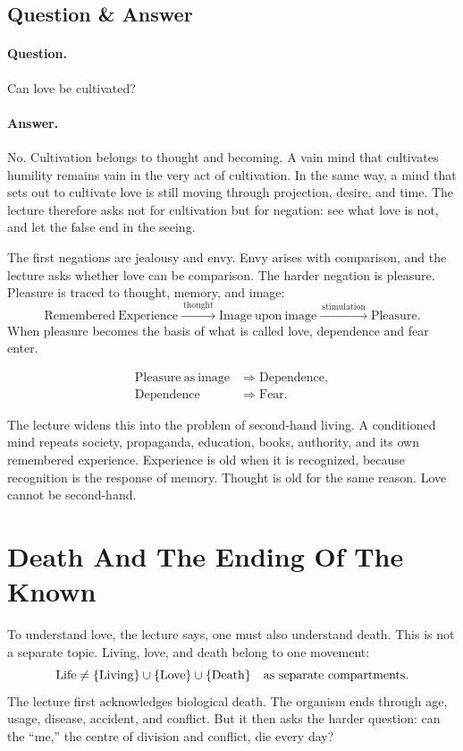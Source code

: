\documentclass[11pt,oneside]{book}
\begin{document}
\subsection{Question \& Answer}

\paragraph{Question.}
Can love be cultivated?

\paragraph{Answer.}
No. Cultivation belongs to thought and becoming. A vain mind that cultivates humility remains vain in the very act of cultivation. In the same way, a mind that sets out to cultivate love is still moving through projection, desire, and time. The lecture therefore asks not for cultivation but for negation: see what love is not, and let the false end in the seeing.

The first negations are jealousy and envy. Envy arises with comparison, and the lecture asks whether love can be comparison. The harder negation is pleasure. Pleasure is traced to thought, memory, and image:
\begin{equation}
\mathrm{Remembered\ Experience}
\xrightarrow{\ \mathrm{thought}\ }
\mathrm{Image\ upon\ image}
\xrightarrow{\ \mathrm{stimulation}\ }
\mathrm{Pleasure}.
\end{equation}
When pleasure becomes the basis of what is called love, dependence and fear enter.

\begin{align}
\mathrm{Pleasure\ as\ image} &\Rightarrow \mathrm{Dependence},\\
\mathrm{Dependence} &\Rightarrow \mathrm{Fear}.
\end{align}

The lecture widens this into the problem of second-hand living. A conditioned mind repeats society, propaganda, education, books, authority, and its own remembered experience. Experience is old when it is recognized, because recognition is the response of memory. Thought is old for the same reason. Love cannot be second-hand.

\section{Death And The Ending Of The Known}

To understand love, the lecture says, one must also understand death. This is not a separate topic. Living, love, and death belong to one movement:
\begin{equation}
\mathrm{Life}
\neq
\{\mathrm{Living}\}\cup\{\mathrm{Love}\}\cup\{\mathrm{Death}\}
\quad
\hbox{as separate compartments.}
\end{equation}
The lecture first acknowledges biological death. The organism ends through age, usage, disease, accident, and conflict. But it then asks the harder question: can the ``me,'' the centre of division and conflict, die every day?
\end{document}
